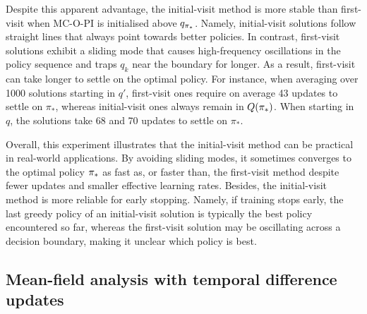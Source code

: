 Despite this apparent advantage, the initial-visit method is more stable than first-visit when MC-O-PI is initialised above $q_{{\pi}_*}$.
Namely, initial-visit solutions follow straight lines that always point towards better policies.
In contrast, first-visit solutions exhibit a sliding mode that causes high-frequency oscillations in the policy sequence and traps $q_k$ near the boundary for longer.
As a result, first-visit can take longer to settle on the optimal policy.
For instance, when averaging over 1000 solutions starting in $q'$, first-visit ones require on average 43 updates to settle on $\pi_*$, whereas initial-visit ones always remain in $Q({\pi}_*)$.
When starting in $q$, the solutions take 68 and 70 updates to settle on $\pi_*$.


Overall, this experiment illustrates that the initial-visit method can be practical in real-world applications. 
By avoiding sliding modes, it sometimes converges to the optimal policy ${\pi}_*$ as fast as, or faster than, the first-visit method despite fewer updates and smaller effective learning rates.
Besides, the initial-visit method is more reliable for early stopping. Namely, if training stops early, the last greedy policy of an initial-visit solution is typically the best policy encountered so far, whereas the first-visit solution may be oscillating across a decision boundary, making it unclear which policy is best.

%


%
%
%

%
%
%

%
%





%
%
%

%
%
%
%
%

%
%
%
%
%
%

%
%
%
%
%
%
%
%
%


%
%
%


%
%
%
%
%
%
%
%
%
%
%
%
%
%
%


%
%
%
%
%
%
%
%
%
%


%
%
%
%


%
%

%

%

%




%
%
\subsection{Mean-field analysis with temporal difference updates}
\label{sec: discussion temporal difference}

